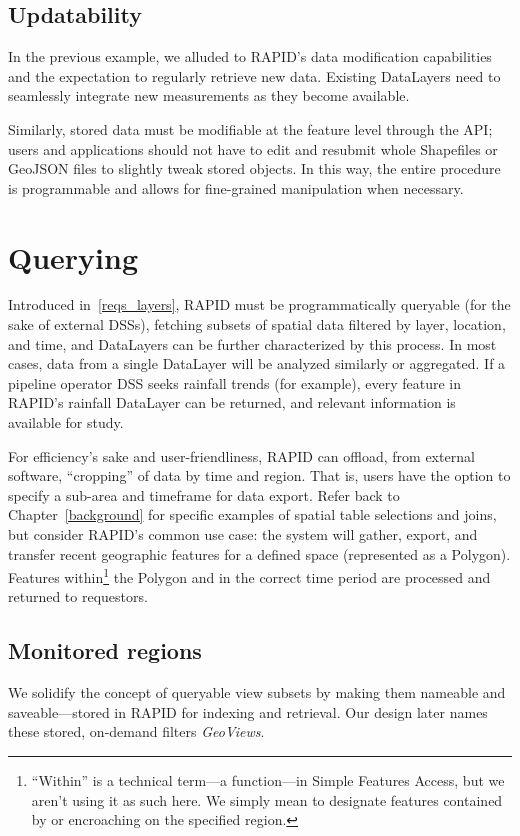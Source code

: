 \subsection{Updatability}
In the previous example, we alluded to RAPID's data modification capabilities and the expectation to regularly retrieve new data. Existing DataLayers need to seamlessly integrate new measurements as they become available.

Similarly, stored data must be modifiable at the feature level through the API; users and applications should not have to edit and resubmit whole Shapefiles or GeoJSON files to slightly tweak stored objects. In this way, the entire procedure is programmable and allows for fine-grained manipulation when necessary.

\section{Querying}

Introduced in~\ref{reqs_layers}, RAPID must be programmatically queryable (for the sake of external DSSs), fetching subsets of spatial data filtered by layer, location, and time, and DataLayers can be further characterized by this process. In most cases, data from a single DataLayer will be analyzed similarly or aggregated. If a pipeline operator DSS seeks rainfall trends (for example), every feature in RAPID's rainfall DataLayer can be returned, and relevant information is available for study.

For efficiency's sake and user-friendliness, RAPID can offload, from external software, ``cropping'' of data by time and region. That is, users have the option to specify a sub-area and timeframe for data export. Refer back to Chapter~\ref{background} for specific examples of spatial table selections and joins, but consider RAPID's common use case: the system will gather, export, and transfer recent geographic features for a defined space (represented as a Polygon). Features within\footnote{``Within'' is a technical term---a function---in Simple Features Access, but we aren't using it as such here. We simply mean to designate features contained by or encroaching on the specified region.} the Polygon and in the correct time period are processed and returned to requestors.

\subsection{Monitored regions}
We solidify the concept of queryable view subsets by making them nameable and saveable---stored in RAPID for indexing and retrieval. Our design later names these stored, on-demand filters \textit{GeoViews}.

